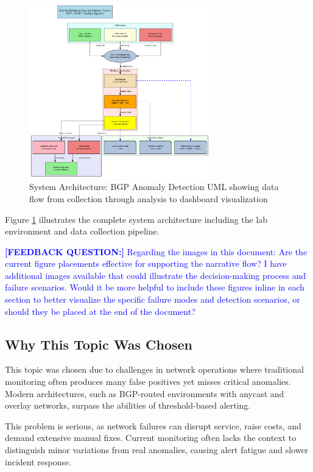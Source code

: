 \documentclass[11pt]{article}
\begin{document}
\begin{figure}[h]
\centering
\includegraphics[width=0.7\textwidth]{system_architecture.png}
\caption{System Architecture: BGP Anomaly Detection UML showing data flow from collection through analysis to dashboard visualization}
\label{fig:architecture}
\end{figure}

Figure \ref{fig:architecture} illustrates the complete system architecture including the lab environment and data collection pipeline.

\textcolor{blue}{\textbf{[FEEDBACK QUESTION:]} Regarding the images in this document: Are the current figure placements effective for supporting the narrative flow? I have additional images available that could illustrate the decision-making process and failure scenarios. Would it be more helpful to include these figures inline in each section to better visualize the specific failure modes and detection scenarios, or should they be placed at the end of the document?}

\subsection{Why This Topic Was Chosen}

This topic was chosen due to challenges in network operations where traditional monitoring often produces many false positives yet misses critical anomalies. Modern architectures, such as BGP-routed environments with anycast and overlay networks, surpass the abilities of threshold-based alerting.

This problem is serious, as network failures can disrupt service, raise costs, and demand extensive manual fixes. Current monitoring often lacks the context to distinguish minor variations from real anomalies, causing alert fatigue and slower incident response.
\end{document}
